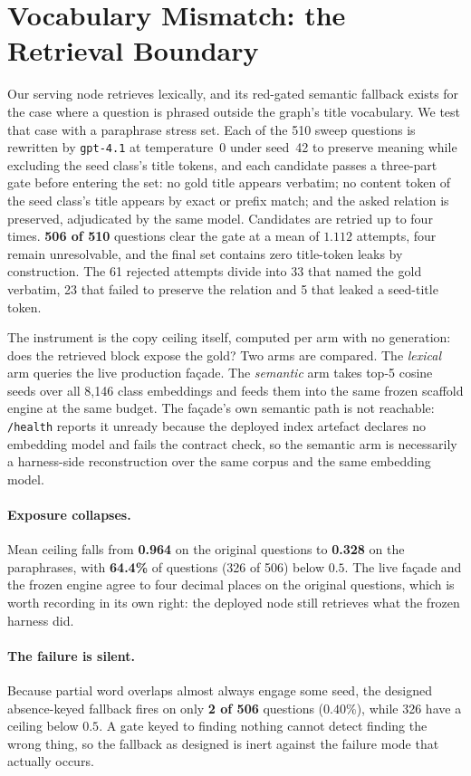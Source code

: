 \documentclass[10pt,twocolumn]{article}
\begin{document}
\section{Vocabulary Mismatch: the Retrieval Boundary}\label{sec:paraphrase}
Our serving node retrieves lexically, and its red-gated semantic fallback exists for the case where a
question is phrased outside the graph's title vocabulary. We test that case with a paraphrase stress
set. Each of the 510 sweep questions is rewritten by \texttt{gpt-4.1} at temperature~0 under seed~42
to preserve meaning while excluding the seed class's title tokens, and each candidate passes a
three-part gate before entering the set: no gold title appears verbatim; no content token of the seed
class's title appears by exact or prefix match; and the asked relation is preserved, adjudicated by
the same model. Candidates are retried up to four times. \textbf{506 of 510} questions clear the gate
at a mean of $1.112$ attempts, four remain unresolvable, and the final set contains zero title-token
leaks by construction. The 61 rejected attempts divide into 33 that named the gold verbatim, 23 that
failed to preserve the relation and 5 that leaked a seed-title token.

The instrument is the copy ceiling itself, computed per arm with no generation: does the retrieved
block expose the gold? Two arms are compared. The \emph{lexical} arm queries the live production
fa\c{c}ade. The \emph{semantic} arm takes top-5 cosine seeds over all 8{,}146 class embeddings and
feeds them into the same frozen scaffold engine at the same budget. The fa\c{c}ade's own semantic
path is not reachable: \texttt{/health} reports it unready because the deployed index artefact
declares no embedding model and fails the contract check, so the semantic arm is necessarily a
harness-side reconstruction over the same corpus and the same embedding model.

\paragraph{Exposure collapses.} Mean ceiling falls from \textbf{0.964} on the original questions to
\textbf{0.328} on the paraphrases, with \textbf{64.4\%} of questions (326 of 506) below $0.5$. The
live fa\c{c}ade and the frozen engine agree to four decimal places on the original questions, which
is worth recording in its own right: the deployed node still retrieves what the frozen harness did.

\paragraph{The failure is silent.} Because partial word overlaps almost always engage some seed, the
designed absence-keyed fallback fires on only \textbf{2 of 506} questions ($0.40\%$), while 326 have
a ceiling below $0.5$. A gate keyed to finding nothing cannot detect finding the wrong thing, so the
fallback as designed is inert against the failure mode that actually occurs.
\end{document}
